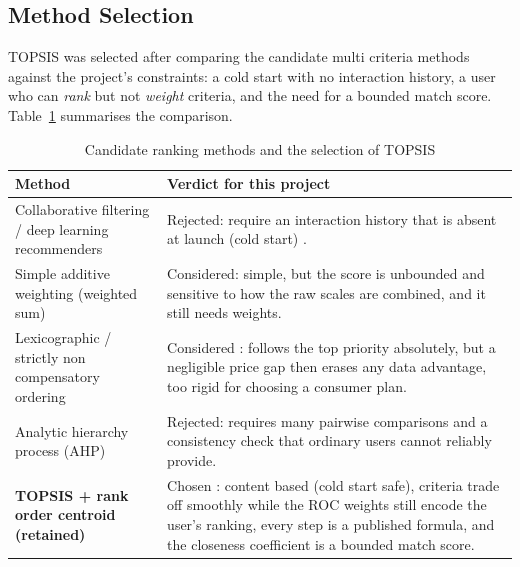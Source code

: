 \subsection{Method Selection}

TOPSIS was selected after comparing the candidate multi criteria methods against the project's constraints: a cold start with no interaction history, a user who can \emph{rank} but not \emph{weight} criteria, and the need for a bounded match score. Table~\ref{tab:rec-history} summarises the comparison.

\begin{table}[H]
  \caption{Candidate ranking methods and the selection of TOPSIS}
  \label{tab:rec-history}
  \centering\small
  \begin{tabular}{|p{4.4cm}|p{9.0cm}|}
    \hline
    \textbf{Method} & \textbf{Verdict for this project} \\ \hline
    Collaborative filtering / deep learning recommenders & Rejected: require an interaction history that is absent at launch (cold start) \parencite{AdomaviciusTuzhilin2005, ZhangColdStart2025}. \\ \hline
    Simple additive weighting (weighted sum) & Considered: simple, but the score is unbounded and sensitive to how the raw scales are combined, and it still needs weights. \\ \hline
    Lexicographic / strictly non compensatory ordering & Considered \parencite{Fishburn1974, Roberts1979}: follows the top priority absolutely, but a negligible price gap then erases any data advantage, too rigid for choosing a consumer plan. \\ \hline
    Analytic hierarchy process (AHP) & Rejected: requires many pairwise comparisons and a consistency check that ordinary users cannot reliably provide. \\ \hline
    \textbf{TOPSIS + rank order centroid (retained)} & Chosen \parencite{HwangYoon1981, BarronBarrett1996, TaherdoostMadanchian2023}: content based (cold start safe), criteria trade off smoothly while the ROC weights still encode the user's ranking, every step is a published formula, and the closeness coefficient is a bounded match score. \\ \hline
  \end{tabular}
\end{table}

